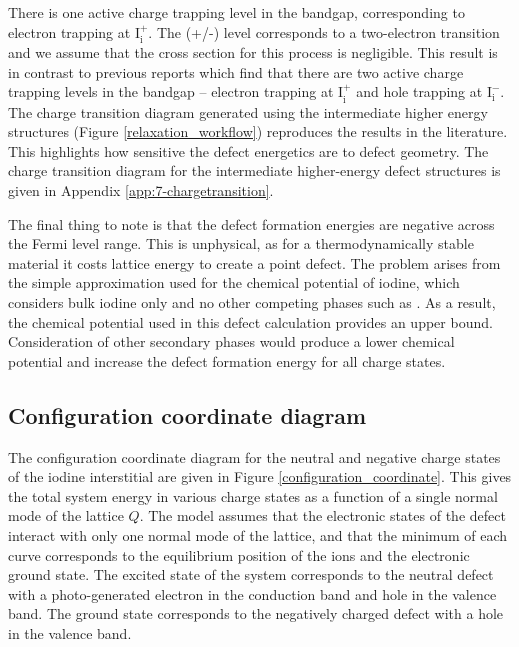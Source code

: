 There is one active charge trapping level in the bandgap, corresponding to electron trapping at $\mathrm{I}_\mathrm{i}^+$.  The (+/-) level corresponds to a two-electron transition and we assume that the cross section for this process is negligible. This result is in contrast to previous reports which find that there are two active charge trapping levels in the bandgap -- electron trapping at $\mathrm{I}_\mathrm{i}^+$ and hole trapping at $\mathrm{I}_\mathrm{i}^-$.
The charge transition diagram generated using the intermediate higher energy structures (Figure \ref{relaxation_workflow}) reproduces the results in the literature. This highlights how sensitive the defect energetics are to defect geometry. The charge transition diagram for the intermediate higher-energy defect structures is given in Appendix \ref{app:7-chargetransition}.

The final thing to note is that the defect formation energies are negative across the Fermi level range. This is unphysical, as for a thermodynamically stable material it costs lattice energy to create a point defect. The problem arises from the simple approximation used for the chemical potential of iodine, which considers bulk iodine only and no other competing phases such as . As a result, the chemical potential used in this defect calculation provides an upper bound. Consideration of other secondary phases would produce a lower chemical potential and increase the defect formation energy for all charge states. 

\subsection{Configuration coordinate diagram} \label{ch6:ccd}

The configuration coordinate diagram for the neutral and negative charge states of the iodine interstitial are given in Figure \ref{configuration_coordinate}.
This gives the total system energy in various charge states as a function of a single normal mode of the lattice $Q$. 
The model assumes that the electronic states of the defect interact with only one normal mode of the lattice, and that
the minimum of each curve corresponds to the equilibrium position of the ions and the electronic ground state. 
The excited state of the system corresponds to the neutral defect with a photo-generated electron in the conduction band and hole in the valence band. The ground state corresponds to the negatively charged defect with a hole in the valence band.
\autocite{alkauskas defect theory and experiment}

